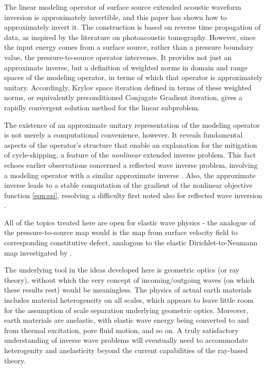 \documentclass[12pt]{geophysics}
\begin{document}
The linear modeling operator of surface source extended acoustic
waveform inversion is approximately invertible, and this paper has
shown how to approximately invert it. The construction is based on
reverse time propagation of data, as inspired by the literature on
photoacoustic tomography. However, since the input energy comes from a
surface source, rather than a pressure boundary value, the
pressure-to-source operator intervenes. It provides not just an
approximate inverse, but a definition of weighted norms in domain and
range spaces of the modeling operator, in terms of which that operator
is approximately unitary. Accordingly, Krylov space iteration defined
in terms of these weighted norms, or equivalently preconditioned
Conjugate Gradient iteration, gives a rapidly convergent solution
method for the linear subproblem.

The existence of an approximate unitary representation of the modeling
operator is not merely a computational convenience, however. It
reveals fundamental aspects of the operator's structure that enable
an explanation for the mitigation of cycle-skipping, a feature of the
{\em nonlinear} extended inverse problem. This fact echoes earlier observations
concerned a reflected wave inverse problem, involving a modeling
operator with a similar approximate inverse
\cite[]{tenKroode:IPTA14,Symes:IPTA14}. Also, the approximate inverse
leads to a stable computation of the gradient of the nonlinear
objective function \ref{eqn:esi}, resolving a difficulty first noted
also for reflected wave inversion \cite[]{KerSy:94}.

All of the topics
treated here are open for elastic wave physics - the analogue of the
pressure-to-source map would is the map from surface velocity field to
corresponding constitutive defect, analogous to the elastic
Dirichlet-to-Neumann map investigated by \cite{Rachele:00}.

The underlying tool in the ideas developed here is geometric optics
(or ray theory), without which the very concept of incoming/outgoing waves
(on which these results rest) would be meaningless. The physics of actual earth materials includes
material heterogeneity on all scales, which appears to leave little
room for the assumption of scale separation underlying geometric
optics. Moreover, earth materials are anelastic, with elastic wave
energy being converted to and from thermal excitation, pore fluid
motion, and so on. A truly satisfactory understanding of inverse wave
problems will eventually need to accommodate heterogenity and
anelasticity beyond the current capabilities of the ray-based theory.
\end{document}
